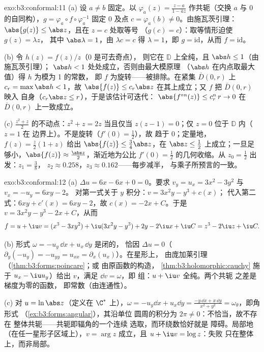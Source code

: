 \begin{solution}{exo:b3:conformal:11}
(a) 设 $a \neq b$ 固定。以 $\varphi_a(z) =
\frac{z - a}{1 - \bar az}$ 作共轭（交换 $a$
与 $0$ 的自同构），$g = \varphi_a\circ f\circ\varphi_a^{-1}$ 固定
$0$ 及点 $c = \varphi_a(b) \neq 0$。由施瓦茨引理：
$\abs{g(z)} \leq \abs z$，且在 $z = c$ 处取等号
（$g(c) = c$）：取等情形迫使 $g(z) = \lambda z$，
其中 $\abs\lambda = 1$，由 $\lambda c = c$ 得 $\lambda =
1$，即 $g = \mathrm{id}$，从而 $f = \mathrm{id}$。

(b) 令 $h(z) = f(z)/z$（$0$ 是可去奇点），
则它在 $\mathbb D$ 上全纯，且 $\abs h \leq 1$（由施瓦茨引理）；
$\abs h < 1$ 处处成立，否则由最大模原理
（$\abs h$ 在内点取最大值）得 $h$ 为模为 1 的常数，
即 $f$ 为旋转——被排除。在紧集
$\bar D(0,r)$ 上 $c_r = \max\abs h < 1$，故 $\abs{f(z)} \leq
c_r\abs z$ 在其上成立；又 $f$ 把 $\bar D(0,r)$ 映入
自身（$c_r\abs z \leq r$），于是该估计可迭代：
$\abs{f^{\circ n}(z)} \leq c_r^n\,r \to 0$ 在
$\bar D(0, r)$ 上一致成立。

(c) $\frac{z^2 + z}2$ 的不动点：$z^2 + z = 2z$
当且仅当 $z(z - 1) = 0$；仅 $z = 0$ 位于 $\mathbb D$ 内（$z = 1$ 在
边界上）。不是旋转（$f'(0) = \frac12$），故
趋于 $0$；定量地，$f(z) = \frac z2(1 + z)$
给出 $\abs{f(z)} \leq \frac{3}{4}\abs z$，在 $\abs z \leq
\frac12$ 上成立；一旦足够小，$\abs{f(z)} \approx
\frac{\abs z}2$，渐近地为公比
$f'(0) = \frac12$ 的几何收缩。从 $z_0 = \frac12$ 出发：$z_1 = \frac38$，
$z_2 \approx 0.258$，$z_3 \approx 0.162$——每步减半，
与乘子所预言的一致。
\end{solution}

\begin{solution}{exo:b3:conformal:12}
(a) $\Delta u = 6x - 6x + 0 = 0$。要求
$v_y = u_x = 3x^2 - 3y^2$ 与 $v_x = -u_y = 6xy - 2$。
对第一式关于 $y$ 积分：$v = 3x^2y - y^3 + c(x)$；
代入第二式：$6xy + c'(x) = 6xy - 2$，故 $c(x)
= -2x + C$。于是 $v = 3x^2y - y^3 - 2x + C$，从而
\[
f = u + \iu v = (x^3 - 3xy^2) + \iu(3x^2y - y^3)
+ 2y - 2\iu x + \iu C = z^3 - 2\iu z + \iu C .
\]

(b) 形式 $\omega = -u_y\,\dd x + u_x\,\dd y$ 是闭的，
恰因 $\Delta u = 0$（$\partial_y(-u_y) =
-u_{yy} = u_{xx} = \partial_x(u_x)$）。在星形上，
由庞加莱引理（\cref{thm:b3:forms:poincare}；或
由原函数的构造，
\cref{thm:b3:holomorphic:cauchy} 施于
$u_x - \iu u_y$）给出 $v$，满足 $\dd v = \omega$，即
组：$u + \iu v$ 全纯。两个共轭
之差是梯度为零的函数，
即常数（由连通性）。

(c) 对 $u = \ln\abs z$（定义在 $\C^*$ 上），$\omega = -u_y\dd x +
u_x\dd y = \frac{-y\,\dd x + x\,\dd y}{x^2 + y^2} =
\omega_\theta$，即角形式
（\cref{ex:b3:forms:angular}），其沿单位
圆周的积分为 $2\pi \neq 0$：不恰当，故不存在
整体共轭——共轭即辐角的一个连续
选取，而环绕数恰好就是
障碍。局部地（在任一星形子区域上），$v =
\arg z$ 成立，且 $u + \iu v = \log z$：失败
只在整体上，而非局部。
\end{solution}

